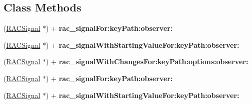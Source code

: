 \subsection*{Class Methods}
\begin{DoxyCompactItemize}
\item 
\mbox{\label{category_n_s_object_07_r_a_c_property_subscribing_deprecated_08_aee677cd61e4b6ded9cf4ba37630b6687}} 
(\mbox{\hyperlink{interface_r_a_c_signal}{R\+A\+C\+Signal}} $\ast$) + {\bfseries rac\+\_\+signal\+For\+:key\+Path\+:observer\+:}
\item 
\mbox{\label{category_n_s_object_07_r_a_c_property_subscribing_deprecated_08_a71157d053646b3f205657f0ffdd5fb97}} 
(\mbox{\hyperlink{interface_r_a_c_signal}{R\+A\+C\+Signal}} $\ast$) + {\bfseries rac\+\_\+signal\+With\+Starting\+Value\+For\+:key\+Path\+:observer\+:}
\item 
\mbox{\label{category_n_s_object_07_r_a_c_property_subscribing_deprecated_08_a2699db3e1fb60a4fd388465f59052751}} 
(\mbox{\hyperlink{interface_r_a_c_signal}{R\+A\+C\+Signal}} $\ast$) + {\bfseries rac\+\_\+signal\+With\+Changes\+For\+:key\+Path\+:options\+:observer\+:}
\item 
\mbox{\label{category_n_s_object_07_r_a_c_property_subscribing_deprecated_08_aee677cd61e4b6ded9cf4ba37630b6687}} 
(\mbox{\hyperlink{interface_r_a_c_signal}{R\+A\+C\+Signal}} $\ast$) + {\bfseries rac\+\_\+signal\+For\+:key\+Path\+:observer\+:}
\item 
\mbox{\label{category_n_s_object_07_r_a_c_property_subscribing_deprecated_08_a71157d053646b3f205657f0ffdd5fb97}} 
(\mbox{\hyperlink{interface_r_a_c_signal}{R\+A\+C\+Signal}} $\ast$) + {\bfseries rac\+\_\+signal\+With\+Starting\+Value\+For\+:key\+Path\+:observer\+:}
\item 
\mbox{\label{category_n_s_object_07_r_a_c_property_subscribing_deprecated_08_a2699db3e1fb60a4fd388465f59052751}} 

\end{DoxyCompactItemize}
